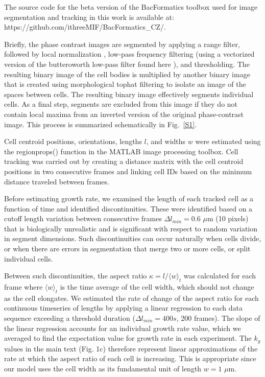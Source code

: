\documentclass[aps,prl,numerical,reprint,superscriptaddress,showpacs]{revtex4-1}
\begin{document}
The source code for the beta version of the BacFormatics toolbox used for image segmentation and tracking in this work is available at: \\https://github.com/ithreeMIF/BacFormatics\_CZ/. 

Briefly, the phase contrast images are segmented by applying a range filter, followed by local normalization \cite{locnorm}, low-pass frequency filtering (using a vectorized version of the butteroworth low-pass filter found here \cite{lpf}), and thresholding. The resulting binary image of the cell bodies is multiplied by another binary image that is created using morphological tophat filtering to isolate an image of the spaces between cells. The resulting binary image effectively segments individual cells. As a final step, segments are excluded from this image if they do not contain local maxima from an inverted version of the original phase-contrast image. This process is summarized schematically in Fig.~{\ref{S1}}.

Cell centroid positions, orientations, lengths $l$, and widths $w$ were estimated using the regionprops() function in the MATLAB image processing toolbox. Cell tracking was carried out by creating a distance matrix with the cell centroid positions in two consecutive frames and linking cell IDs based on the minimum distance traveled between frames.

Before estimating growth rate, we examined the length of each tracked cell as a function of time and identified discontinuities. These were identified based on a cutoff length variation between consecutive frames $\Delta l_{min} = 0.6$ $\mu$m (10 pixels) that is biologically unrealistic and is significant with respect to random variation in segment dimensions. Such discontinuities can occur naturally when cells divide, or when there are errors in segmentation that merge two or more cells, or split individual cells. 

Between such discontinuities, the aspect ratio $\kappa = l/\langle w \rangle_{t}$ was calculated for each frame where $\langle w \rangle_{t}$ is the time average of the cell width, which should not change as the cell elongates. We estimated the rate of change of the aspect ratio for each continuous timeseries of lengths by applying a linear regression to each data sequence exceeding a threshold duration ($\Delta l_{min} = 400s$, 200 frames). The slope of the linear regression accounts for an individual growth rate value, which we averaged to find the expectation value for growth rate in each experiment. The $k_g$ values in the main text (Fig. 1c) therefore represent linear approximations of the rate at which the aspect ratio of each cell is increasing. This is appropriate since our model uses the cell width as its fundamental unit of length $w = 1$ $\mu$m. 
\end{document}
